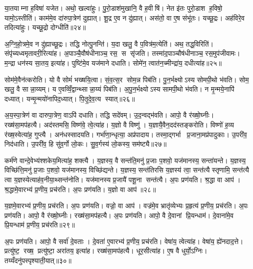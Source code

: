 या॒तयाम्ना ह॒विषा॑ यजेत। अथो॒ खल्वा॑हुः। पु॒रो॒डाश॑मुखानि॒ वै ह॒वीषि॑। नेत इ॑तः पुरो॒डाश ह॒विषो॒ यामो॒ऽस्तीति॑। काम॑मे॒व दा॑रुपा॒त्रेण॑ दुह्यात्। शू॒द्र ए॒व न दु॑ह्यात्। अस॑तो॒ वा ए॒ष संभू॑तः। यच्छू॒द्रः। अह॑विरे॒व तदित्या॑हुः। यच्छू॒द्रो दोग्धीति॑॥२४॥

अ॒ग्नि॒हो॒त्रमे॒व न दु॑ह्याच्छू॒द्रः। तद्धि नोत्पु॒नन्ति॑। य॒दा खलु॒ वै प॒वित्र॑म॒त्येति॑। अथ॒ तद्ध॒विरिति॑। संपृ॑च्यध्वमृतावरी॒रित्या॑ह। अ॒पाञ्चै॒वौष॑धीनाञ्च॒ रस॒ स सृ॑जति। तस्मा॑द॒पाञ्चौष॑धीनाञ्च॒ रस॒मुप॑जीवामः। म॒न्द्रा धन॑स्य सा॒तय॒ इत्या॑ह। पुष्टि॑मे॒व यज॑माने दधाति। सोमे॑न॒ त्वात॑न॒च्मीन्द्रा॑य॒ दधीत्या॑ह॥२५॥

सोम॑मे॒वैन॑त्करोति। यो वै सोमं॑ भख्षयि॒त्वा। सं॒व॒त्स॒र सोम॒न्न पिब॑ति। पु॒न॒र्भक्ष्योऽस्य सोमपी॒थो भ॑वति। सोम॒ खलु॒ वै सान्ना॒य्यम्। य ए॒वव्विँ॒द्वान्थ्सान्ना॒य्यं पिब॑ति। अ॒पु॒न॒र्भक्ष्योऽस्य सामपी॒थो भ॑वति। न मृ॒न्मये॒नापि॑ दध्यात्। यन्मृ॒न्मयो॑नापिद॒ध्यात्। पि॒तृ॒दे॒व॒त्य स्यात्॥२६॥

अ॒य॒स्पा॒त्रेण॑ वा दारुपा॒त्रेण॒ वाऽपि॑ दधाति। तद्धि सदे॑वम्। उ॒द॒न्वद्भ॑वति। आपो॒ वै र॑ख्षो॒घ्नीः। रख्ष॑सा॒मप॑हत्यै। अद॑स्तमसि॒ विष्ण॑वे॒ त्वे॒त्या॑ह। य॒ज्ञो वै विष्णु॑। य॒ज्ञायै॒वैन॒दद॑स्तङ्करोति। विष्णो॑ ह॒व्य र॑ख्ष॒स्वेत्या॑ह॒ गुप्त्यै। अन॑धस्सादयति। गर्भा॑णा॒न्धृत्या॒ अप्र॑पादाय। तस्मा॒द्गर्भा प्र॒जाना॒मप्र॑पादुकाः। उ॒परी॑व॒ निद॑धाति। उ॒परी॑व॒ हि सु॑व॒र्गो लो॒कः। सु॒व॒र्गस्य॑ लो॒कस्य॒ सम॑ष्ट्यै॥२७॥

कर्म॑णे वान्दे॒वेभ्य॑श्शकेय॒मित्या॑ह॒ शक्त्यै। य॒ज्ञस्य॒ वै सन्त॑ति॒मनु॑ प्र॒जाः प॒शवो॒ यज॑मानस्य॒ सन्ता॑यन्ते। य॒ज्ञस्य॒ विच्छि॑त्ति॒मनु॑ प्र॒जाः प॒शवो॒ यज॑मानस्य॒ विच्छि॑द्यन्ते। य॒ज्ञस्य॒ सन्त॑तिरसि य॒ज्ञस्य॑ त्वा॒ सन्त॑त्यै स्तृणामि॒ सन्त॑त्यै त्वा य॒ज्ञस्येत्याह॑व॒नीया॒थ्सन्त॑नोति। यज॑मानस्य प्र॒जायै॑ पशू॒ना सन्त॑त्यै। अ॒पः प्रण॑यति। श्र॒द्धा वा आप॑। श्र॒द्धामे॒वारभ्य॑ प्र॒णीय॒ प्रच॑रति। अ॒पः प्रण॑यति। य॒ज्ञो वा आप॑॥२८॥

य॒ज्ञमे॒वारभ्य॑ प्र॒णीय॒ प्रच॑रति। अ॒पः प्रण॑यति। वज्रो॒ वा आप॑। वज्र॑मे॒व भ्रातृ॑व्येभ्यः प्र॒हृत्य॑ प्र॒णीय॒ प्रच॑रति। अ॒पः प्रण॑यति। आपो॒ वै र॑ख्षो॒घ्नीः। रख्ष॑सा॒मप॑हत्यै। अ॒पः प्रण॑यति। आपो॒ वै दे॒वानां प्रि॒यन्धाम॑। दे॒वाना॑मे॒व प्रि॒यन्धाम॑ प्र॒णीय॒ प्रच॑रति॥२९॥

अ॒पः प्रण॑यति। आपो॒ वै सर्वा॑ दे॒वताः। दे॒वता॑ ए॒वारभ्य॑ प्र॒णीय॒ प्रच॑रति। वेषा॑य॒ त्वेत्या॑ह। वेषा॑य॒ ह्ये॑नदाद॒त्ते। प्रत्यु॑ष्ट॒ रख्ष॒ प्रत्यु॑ष्टा॒ अरा॑तय॒ इत्या॑ह। रख्ष॑सा॒मप॑हत्यै। धूर॒सीत्या॑ह। ए॒ष वै धुर्यो॒ऽग्निः। तय्यँदनु॑पस्पृश्याती॒यात्॥३०॥

